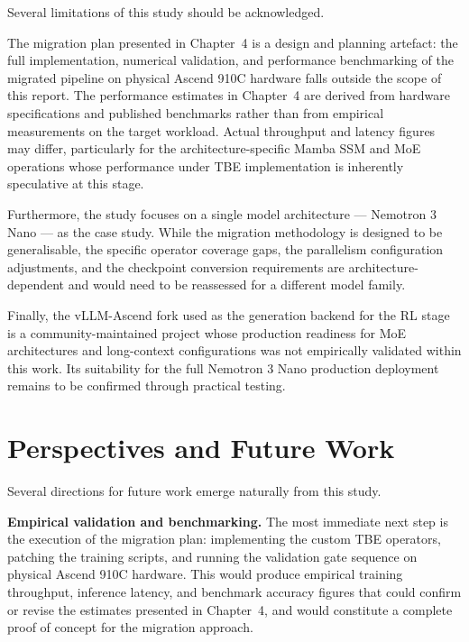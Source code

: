 Several limitations of this study should be acknowledged.

The migration plan presented in Chapter~4 is a design and
planning artefact: the full implementation, numerical validation,
and performance benchmarking of the migrated pipeline on physical
Ascend 910C hardware falls outside the scope of this report.
The performance estimates in Chapter~4 are derived from hardware
specifications and published benchmarks rather than from
empirical measurements on the target workload. Actual throughput
and latency figures may differ, particularly for the
architecture-specific Mamba SSM and MoE operations whose
performance under TBE implementation is inherently speculative
at this stage.

Furthermore, the study focuses on a single model architecture
— Nemotron 3 Nano — as the case study. While the migration
methodology is designed to be generalisable, the specific
operator coverage gaps, the parallelism configuration
adjustments, and the checkpoint conversion requirements are
architecture-dependent and would need to be reassessed for
a different model family.

Finally, the vLLM-Ascend fork used as the generation backend
for the RL stage is a community-maintained project whose
production readiness for MoE architectures and long-context
configurations was not empirically validated within this work.
Its suitability for the full Nemotron 3 Nano production
deployment remains to be confirmed through practical testing.

\section*{Perspectives and Future Work}

Several directions for future work emerge naturally from this
study.

\textbf{Empirical validation and benchmarking.} The most
immediate next step is the execution of the migration plan:
implementing the custom TBE operators, patching the training
scripts, and running the validation gate sequence on physical
Ascend 910C hardware. This would produce empirical training
throughput, inference latency, and benchmark accuracy figures
that could confirm or revise the estimates presented in
Chapter~4, and would constitute a complete proof of concept
for the migration approach.

